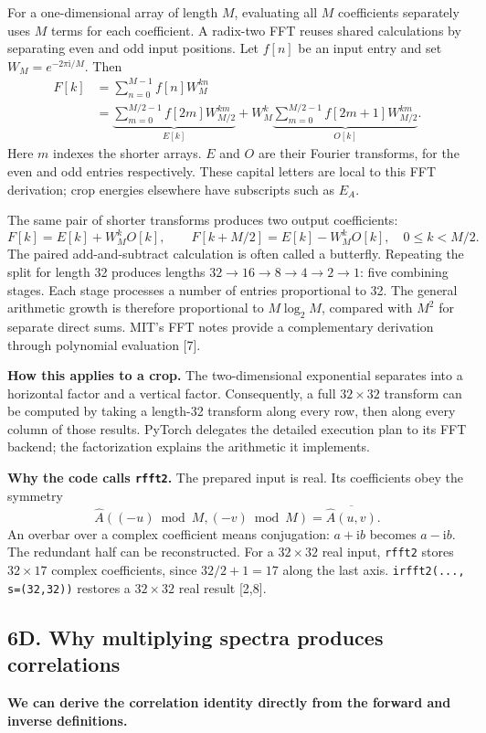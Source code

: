\documentclass[11pt,letterpaper]{article}
\begin{document}
For a one-dimensional array of length $M$, evaluating all $M$ coefficients separately uses $M$ terms for each coefficient. A radix-two FFT reuses shared calculations by separating even and odd input positions. Let $f[n]$ be an input entry and set $W_M=e^{-2\pi\mathrm{i}/M}$. Then
\begin{align}
F[k]&=\sum_{n=0}^{M-1}f[n]W_M^{kn}\\
&=\underbrace{\sum_{m=0}^{M/2-1}f[2m]W_{M/2}^{km}}_{E[k]}
+W_M^k\underbrace{\sum_{m=0}^{M/2-1}f[2m+1]W_{M/2}^{km}}_{O[k]}.
\end{align}
Here $m$ indexes the shorter arrays. $E$ and $O$ are their Fourier transforms, for the even and odd entries respectively. These capital letters are local to this FFT derivation; crop energies elsewhere have subscripts such as $E_A$.

The same pair of shorter transforms produces two output coefficients:
\[
F[k]=E[k]+W_M^kO[k],\qquad
F[k+M/2]=E[k]-W_M^kO[k],\quad 0\leq k<M/2.
\]
The paired add-and-subtract calculation is often called a butterfly. Repeating the split for length 32 produces lengths $32\to16\to8\to4\to2\to1$: five combining stages. Each stage processes a number of entries proportional to 32. The general arithmetic growth is therefore proportional to $M\log_2M$, compared with $M^2$ for separate direct sums. MIT's FFT notes provide a complementary derivation through polynomial evaluation [7].

\textbf{How this applies to a crop.} The two-dimensional exponential separates into a horizontal factor and a vertical factor. Consequently, a full $32\times32$ transform can be computed by taking a length-32 transform along every row, then along every column of those results. PyTorch delegates the detailed execution plan to its FFT backend; the factorization explains the arithmetic it implements.

\textbf{Why the code calls \texttt{rfft2}.} The prepared input is real. Its coefficients obey the symmetry
\[
\widehat A((-u)\bmod M,(-v)\bmod M)=\overline{\widehat A(u,v)}.
\]
An overbar over a complex coefficient means conjugation: $a+\mathrm{i}b$ becomes $a-\mathrm{i}b$. The redundant half can be reconstructed. For a $32\times32$ real input, \texttt{rfft2} stores $32\times17$ complex coefficients, since $32/2+1=17$ along the last axis. \texttt{irfft2(..., s=(32,32))} restores a $32\times32$ real result [2,8].

\clearpage
\subsection*{6D. Why multiplying spectra produces correlations}
\textbf{We can derive the correlation identity directly from the forward and inverse definitions.}
\end{document}
